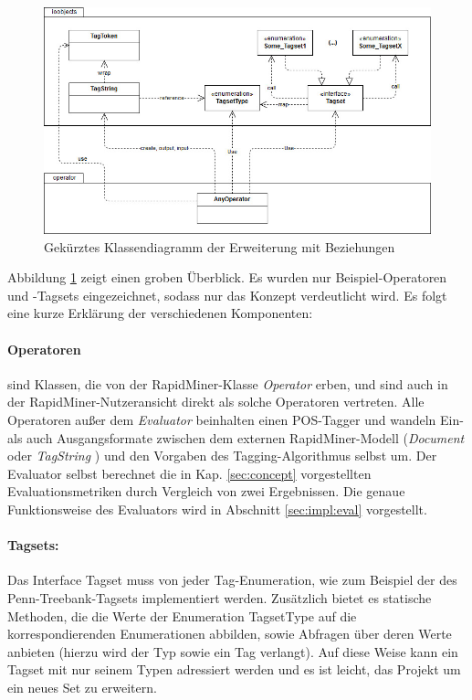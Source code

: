  
\begin{figure}[htb]
	\captionsetup{justification=centering,margin=2cm}
	\includegraphics[width=\textwidth]{gfx/uml_rough.jpg}
	\caption{Gekürztes Klassendiagramm der Erweiterung mit Beziehungen}
	\label{fig:impl:structure:overview}
\end{figure}

Abbildung \ref{fig:impl:structure:overview} zeigt einen groben Überblick. Es wurden nur Beispiel-Operatoren und -Tagsets eingezeichnet, sodass nur das Konzept verdeutlicht wird. Es folgt eine kurze Erklärung der verschiedenen Komponenten:

\paragraph{Operatoren} sind Klassen, die von der RapidMiner-Klasse \textit{Operator} erben, und sind auch in der RapidMiner-Nutzeransicht direkt als solche Operatoren vertreten. Alle Operatoren außer dem \textit{Evaluator} beinhalten einen POS-Tagger und wandeln Ein- als auch Ausgangsformate zwischen dem externen RapidMiner-Modell (\textit{Document} oder \textit{TagString} ) und den Vorgaben des Tagging-Algorithmus selbst um. Der Evaluator selbst berechnet die in Kap. \ref{sec:concept} vorgestellten Evaluationsmetriken durch Vergleich von zwei Ergebnissen. Die genaue Funktionsweise des Evaluators wird in Abschnitt \ref{sec:impl:eval} vorgestellt.

\paragraph{Tagsets:} Das Interface Tagset muss von jeder Tag-Enumeration, wie zum Beispiel der des Penn-Treebank-Tagsets implementiert werden. Zusätzlich bietet es statische Methoden, die die Werte der Enumeration TagsetType auf die korrespondierenden Enumerationen abbilden, sowie Abfragen über deren Werte anbieten (hierzu wird der Typ sowie ein Tag verlangt). Auf diese Weise kann ein Tagset mit nur seinem Typen adressiert werden und es ist leicht, das Projekt um ein neues Set zu erweitern.

